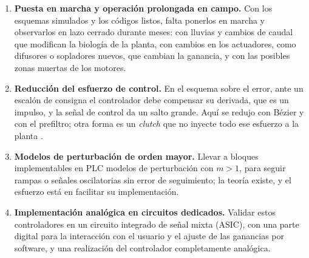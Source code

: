 \begin{enumerate}

  \item \textbf{Puesta en marcha y operación prolongada en campo.} Con los esquemas simulados y los
  códigos listos, falta ponerlos en marcha y observarlos en lazo cerrado durante meses: con lluvias y
  cambios de caudal que modifican la biología de la planta, con cambios en los actuadores, como difusores
  o sopladores nuevos, que cambian la ganancia, y con las posibles zonas muertas de los motores.

  \item \textbf{Reducción del esfuerzo de control.} En el esquema sobre el error, ante un escalón de
  consigna el controlador debe compensar su derivada, que es un impulso, y la señal de control da un
  salto grande. Aquí se redujo con Bézier y con el prefiltro; otra forma es un \emph{clutch} que no
  inyecte todo ese esfuerzo a la planta \cite{quecan2026clutch}.

  \item \textbf{Modelos de perturbación de orden mayor.} Llevar a bloques implementables en PLC modelos
  de perturbación con $m > 1$, para seguir rampas o señales oscilatorias sin error de seguimiento; la
  teoría existe, y el esfuerzo está en facilitar su implementación.

  \item \textbf{Implementación analógica en circuitos dedicados.} Validar estos controladores en un
  circuito integrado de señal mixta (ASIC), con una parte digital para la interacción con el usuario y
  el ajuste de las ganancias por software, y una realización del controlador completamente analógica.

\end{enumerate}
